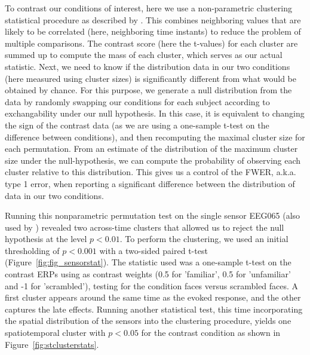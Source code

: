 To contrast our conditions of interest, here we use a non-parametric clustering statistical procedure as described by \cite{maris_nonparametric_2007}. This combines neighboring values that are likely to be correlated (here, neighboring time instants) to reduce the problem of multiple comparisons. The contrast score (here the  t-values) for each cluster are summed up to compute the mass of each cluster, which serves as our actual statistic. Next, we need to know if the distribution data in our two conditions (here measured using cluster sizes) is significantly different from what would be obtained by chance. For this purpose, we generate a null distribution from the data by randomly swapping our conditions for each subject according to exchangability under our null hypothesis. In this case, it is equivalent to changing the sign of the contrast data (as we are using a one-sample t-test on the difference between conditions), and then recomputing the maximal cluster size for each permutation. From an estimate of the distribution of the maximum cluster size under the null-hypothesis, we can compute the probability of observing each cluster relative to this distribution. This gives us a control of the \ac{FWER}, a.k.a. type 1 error, when reporting a significant difference between the distribution of data in our two conditions.

Running this nonparametric permutation test on the single sensor EEG065 (also used by \cite{wakeman2015multi}) revealed two across-time clusters that allowed us to reject the null hypothesis at the level $p < 0.01$. To perform the clustering, we used an initial thresholding of $p < 0.001$ with a two-sided paired t-test (Figure~\ref{fig:fig_sensorstat}). The statistic used was a one-sample t-test on the contrast ERPs using as contrast weights (0.5 for 'familiar', 0.5 for 'unfamiliar' and -1 for 'scrambled'), testing for the condition faces versus scrambled faces. A first cluster appears around the same time as the evoked response, and the other captures the late effects. Running another statistical test, this time incorporating the spatial distribution of the sensors into the clustering procedure, yields one spatiotemporal cluster with $p < 0.05$ for the contrast condition as shown in Figure~\ref{fig:stclusterstats}.

